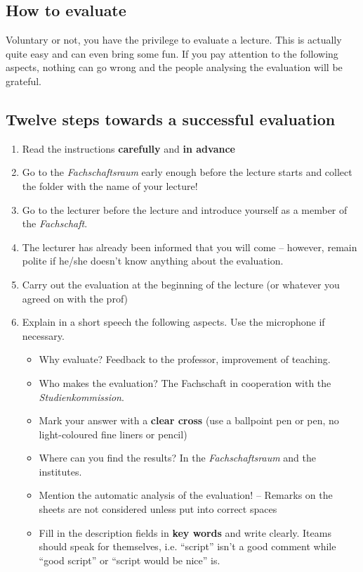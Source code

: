 \documentclass[a4paper,10pt]{article}
\begin{document}
\subsection*{How to evaluate}
Voluntary or not, you have the privilege to evaluate a lecture.  This is actually quite easy and can even bring some fun. If you pay attention to the following aspects, nothing can go wrong and the people analysing the evaluation will be grateful.

\subsection*{Twelve steps towards a successful evaluation}
\begin{enumerate}
\item Read the instructions \textbf{carefully} and \textbf{in advance}
\item Go to the \textit{Fachschaftsraum} early enough before the lecture starts and collect the folder with the name of your lecture!
\item Go to the lecturer before the lecture and introduce yourself as a member of the \textit{Fachschaft}.
\item The lecturer has already been informed that you will come -- however, remain polite if he/she doesn't know anything about the evaluation.
\item Carry out the evaluation at the beginning of the lecture (or whatever you agreed on with the prof)
\item Explain in a short speech the following aspects. Use the microphone if necessary.
    \begin{itemize}
    \item Why evaluate? Feedback to the professor, improvement of teaching.
    \item Who makes the evaluation? The Fachschaft in cooperation with the \textit{Studienkommission}.
    \item Mark your answer with a \textbf{clear cross} (use a ballpoint pen or pen, no light-coloured fine liners or pencil)
    \item Where can you find the results? In the \textit{Fachschaftsraum} and the institutes.
    \item Mention the automatic analysis of the evaluation! -- Remarks on the sheets are not considered unless put into correct spaces
    \item Fill in the description fields in \textbf{key words} and write clearly. Iteams should speak for themselves, i.e. ``script'' isn't a good comment while ``good script'' or ``script would be nice'' is.

\end{itemize}
\end{enumerate}
\end{document}
